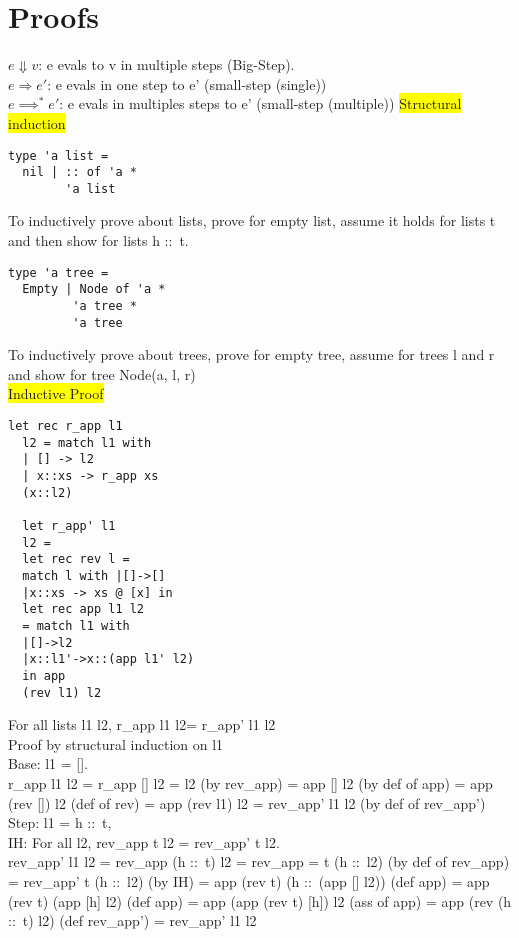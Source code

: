 \section{Proofs}
$e \Downarrow v$: e evals to v in multiple steps (Big-Step).
\\$e\Rightarrow e'$: e evals in one step to e' (small-step
(single))
\\$e \implies^* e'$: e evals in multiples steps to e' (small-step
(multiple))
\colorbox{Yellow}{Structural induction}
\begin{lstlisting}
type 'a list =
  nil | :: of 'a *
        'a list
\end{lstlisting}
To inductively prove about lists, prove for empty list, assume it
holds for lists t and then show for lists h ::\ t.
\begin{lstlisting}
type 'a tree =
  Empty | Node of 'a *
         'a tree *
         'a tree
\end{lstlisting}
To inductively prove about trees, prove for empty tree, assume for
trees l and r and show for tree Node(a, l, r)
\\\colorbox{Yellow}{Inductive Proof}
\begin{lstlisting}
let rec r_app l1
  l2 = match l1 with
  | [] -> l2
  | x::xs -> r_app xs
  (x::l2)
  
  let r_app' l1
  l2 =
  let rec rev l =
  match l with |[]->[]
  |x::xs -> xs @ [x] in
  let rec app l1 l2
  = match l1 with
  |[]->l2
  |x::l1'->x::(app l1' l2)
  in app
  (rev l1) l2
\end{lstlisting}
For all lists l1 l2, r\_app l1 l2= r\_app' l1 l2
\\ Proof by structural induction on l1
\\ Base: l1 = [].
\\ r\_app l1 l2 = r\_app [] l2 = l2 (by rev\_app) = app []
l2 (by def of app) = app (rev []) l2 (def of rev) = app (rev l1) l2 =
rev\_app' l1 l2 (by def of rev\_app')
\\ Step: l1 = h ::\ t,
\\ IH: For all l2, rev\_app t l2 = rev\_app' t l2.
\\ rev\_app' l1 l2 = rev\_app (h ::\ t) l2 = rev\_app = t (h ::\ l2)
(by def of rev\_app) = rev\_app' t (h ::\ l2) (by IH) = app (rev t) (h
::\ (app [] l2)) (def app) = app (rev t) (app [h] l2) (def app) = app
(app (rev t) [h]) l2 (ass of app) = app (rev (h ::\ t) l2) (def
rev\_app') = rev\_app' l1 l2   
\color{Black}
